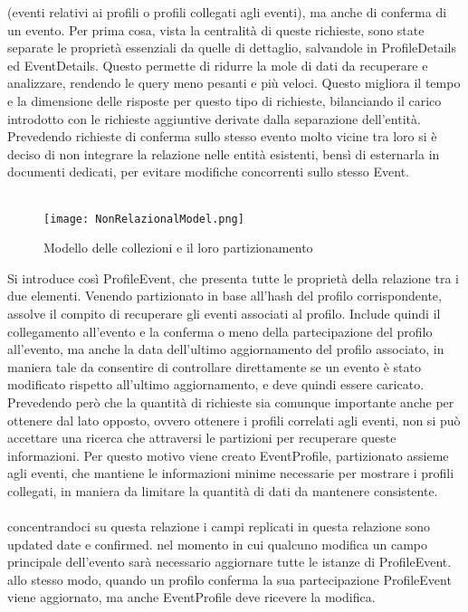 (eventi relativi ai profili o profili collegati agli eventi), 
ma anche di conferma di un evento.
Per prima cosa, vista la centralità di queste richieste,
sono state separate le proprietà essenziali da quelle di dettaglio,
salvandole in ProfileDetails ed EventDetails.
Questo permette di ridurre la mole di dati da recuperare e analizzare, 
rendendo le query meno pesanti e più veloci.
Questo migliora il tempo e la dimensione delle risposte per questo tipo di richieste, 
bilanciando il carico introdotto con le richieste aggiuntive derivate dalla separazione dell'entità.
Prevedendo richieste di conferma sullo stesso evento molto vicine tra loro
si è deciso di non integrare la relazione nelle entità esistenti, 
bensì di esternarla in documenti dedicati, 
per evitare modifiche concorrenti sullo stesso Event.\\
\\
\begin{figure}[htbp]
    \centering
    \texttt{[image: NonRelazionalModel.png]}
    \caption{Modello delle collezioni e il loro partizionamento}
\end{figure}
Si introduce così ProfileEvent, 
che presenta tutte le proprietà della relazione tra i due elementi. 
Venendo partizionato in base all'hash del profilo corrispondente,
assolve il compito di recuperare gli eventi associati al profilo.
Include quindi il collegamento all'evento e
la conferma o meno della partecipazione del profilo all'evento, 
ma anche la data dell'ultimo aggiornamento del profilo associato,
in maniera tale da consentire di controllare direttamente 
se un evento è stato modificato rispetto all'ultimo aggiornamento,
e deve quindi essere caricato.
Prevedendo però che la quantità di richieste sia comunque importante 
anche per ottenere dal lato opposto, 
ovvero ottenere i profili correlati agli eventi, 
non si può accettare una ricerca che attraversi le partizioni per recuperare queste informazioni.
Per questo motivo viene creato EventProfile, 
partizionato assieme agli eventi,
che mantiene le informazioni minime necessarie per mostrare i profili collegati, 
in maniera da limitare la quantità di dati da mantenere consistente.\\
\\
concentrandoci su questa relazione
i campi replicati in questa relazione sono updated date e confirmed.
nel momento in cui qualcuno modifica un campo principale dell'evento sarà necessario aggiornare tutte le istanze di ProfileEvent.
allo stesso modo, quando un profilo conferma la sua partecipazione ProfileEvent viene aggiornato, 
ma anche EventProfile deve ricevere la modifica.

